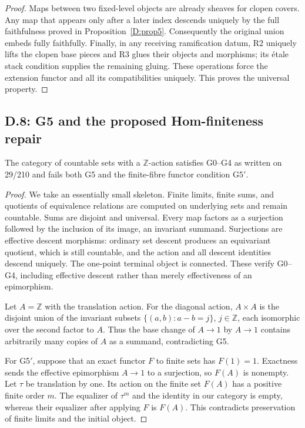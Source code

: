 \begin{proof}
Maps between two fixed-level objects are already sheaves for clopen
covers. Any map that appears only after a later index descends
uniquely by the full faithfulness proved in Proposition~\ref{D:prop5}.
Consequently the original union embeds fully faithfully. Finally,
in any receiving ramification datum, R2 uniquely lifts the clopen
base pieces and R3 glues their objects and morphisms; its \'etale
stack condition supplies the remaining gluing. These operations
force the extension functor and all its compatibilities uniquely.
This proves the universal property.
\end{proof}

\subsection{D.8: G5 and the proposed Hom-finiteness repair}

\begin{proposition}
\label{D:G5-Zsets}
The category of countable sets with a $\mathbb Z$-action satisfies
G0--G4 as written on 29/210 and fails both G5 and the finite-fibre
functor condition G5$'$.
\end{proposition}
\begin{proof}
We take an essentially small skeleton. Finite limits, finite sums,
and quotients of equivalence relations are computed on underlying sets
and remain countable. Sums are disjoint and universal. Every map
factors as a surjection followed by the inclusion of its image, an
invariant summand. Surjections are effective descent morphisms:
ordinary set descent produces an equivariant quotient, which is still
countable, and the action and all descent identities descend uniquely.
The one-point terminal object is connected. These verify G0--G4,
including effective descent rather than merely effectiveness of an
epimorphism.

Let $A=\mathbb Z$ with the translation action. For the diagonal action,
$A\times A$ is the disjoint union of the invariant subsets
$\{(a,b):a-b=j\}$, $j\in\mathbb Z$, each isomorphic over the
second factor to $A$. Thus the base change of $A\to1$ by $A\to1$
contains arbitrarily many copies of $A$ as a summand, contradicting G5.

For G5$'$, suppose that an exact functor $F$ to finite sets has
$F(1)=1$. Exactness sends the effective epimorphism $A\to1$ to a
surjection, so $F(A)$ is nonempty. Let $\tau$ be translation by one.
Its action on the finite set $F(A)$ has a positive finite order $m$.
The equalizer of $\tau^m$ and the identity in our category is empty,
whereas their equalizer after applying $F$ is $F(A)$. This contradicts
preservation of finite limits and the initial object.
\end{proof}

